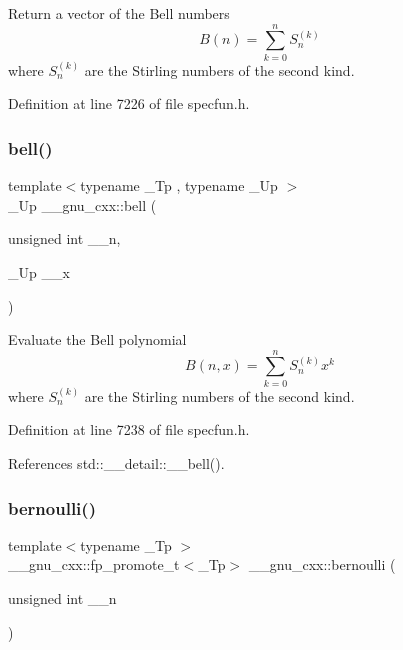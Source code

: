 Return a vector of the Bell numbers \[ B(n) = \sum_{k=0}^{n}S_n^{(k)} \] where $ S_n^{(k)} $ are the Stirling numbers of the second kind. 

Definition at line 7226 of file specfun.\+h.

\mbox{\label{group__mathsf__gnu_ga1e87244cb33a10de204856cafb19046f}} 
\subsubsection{\texorpdfstring{bell()}{bell()}\hspace{0.1cm}{\footnotesize\ttfamily [2/2]}}
{\footnotesize\ttfamily template$<$typename \+\_\+\+Tp , typename \+\_\+\+Up $>$ \\
\+\_\+\+Up \+\_\+\+\_\+gnu\+\_\+cxx\+::bell (\begin{DoxyParamCaption}\item[{unsigned int}]{\+\_\+\+\_\+n,  }\item[{\+\_\+\+Up}]{\+\_\+\+\_\+x }\end{DoxyParamCaption})\hspace{0.3cm}{\ttfamily [inline]}}

Evaluate the Bell polynomial \[ B(n,x) = \sum_{k=0}^{n}S_n^{(k)}x^k \] where $ S_n^{(k)} $ are the Stirling numbers of the second kind. 

Definition at line 7238 of file specfun.\+h.



References std\+::\+\_\+\+\_\+detail\+::\+\_\+\+\_\+bell().

\mbox{\label{group__mathsf__gnu_gad339f0011df1967ec6c9e55bd1547bf4}} 
\subsubsection{\texorpdfstring{bernoulli()}{bernoulli()}\hspace{0.1cm}{\footnotesize\ttfamily [1/2]}}
{\footnotesize\ttfamily template$<$typename \+\_\+\+Tp $>$ \\
\+\_\+\+\_\+gnu\+\_\+cxx\+::fp\+\_\+promote\+\_\+t$<$\+\_\+\+Tp$>$ \+\_\+\+\_\+gnu\+\_\+cxx\+::bernoulli (\begin{DoxyParamCaption}\item[{unsigned int}]{\+\_\+\+\_\+n }\end{DoxyParamCaption})\hspace{0.3cm}{\ttfamily [inline]}}

